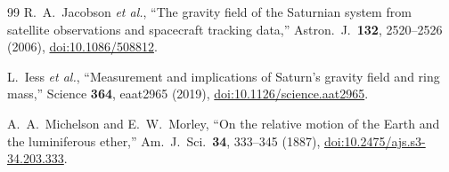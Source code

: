 \documentclass[aps,reprint,amsmath,amssymb,nofootinbib,superscriptaddress,floatfix]{revtex4-2}
\begin{document}
\begin{thebibliography}{99}
R.~A.~Jacobson \emph{et al.}, ``The gravity field of the Saturnian
system from satellite observations and spacecraft tracking data,''
Astron.\ J.\ \textbf{132}, 2520--2526 (2006),
\href{https://doi.org/10.1086/508812}{doi:10.1086/508812}.

L.~Iess \emph{et al.}, ``Measurement and implications of Saturn's
gravity field and ring mass,'' Science \textbf{364}, eaat2965 (2019),
\href{https://doi.org/10.1126/science.aat2965}
{doi:10.1126/science.aat2965}.

A.~A.~Michelson and E.~W.~Morley, ``On the relative motion of the
Earth and the luminiferous ether,''
Am.\ J.\ Sci.\ \textbf{34}, 333--345 (1887),
\href{https://doi.org/10.2475/ajs.s3-34.203.333}
{doi:10.2475/ajs.s3-34.203.333}.

\end{thebibliography}
\end{document}
